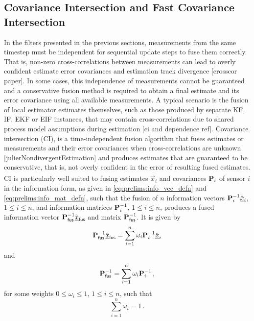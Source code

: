 \subsection{Covariance Intersection and Fast Covariance Intersection}\label{subsec:prelims:fci}
In the filters presented in the previous sections, measurements from the same timestep must be independent for sequential update steps to fuse them correctly. That is, non-zero cross-correlations between measurements can lead to overly confident estimate error covariances and estimation track divergence [crosscor paper]. In some cases, this independence of measurements cannot be guaranteed and a conservative fusion method is required to obtain a final estimate and its error covariance using all available measurements. A typical scenario is the fusion of local estimator estimates themselves, such as those produced by separate KF, IF, EKF or EIF instances, that may contain cross-correlations due to shared process model assumptions during estimation [ci and dependence ref]. Covariance intersection (CI), is a time-independent fusion algorithm that fuses estimates or measurements and their error covariances when cross-correlations are unknown [julierNondivergentEstimation] and produces estimates that are guaranteed to be conservative, that is, not overly confident in the error of resulting fused estimates. CI is particularly well suited to fusing estimates $\hat{\vec{x}}_i$ and covariances ${{\mathbf{P}}}_i$ of sensor $i$ in the information form, as given in \eqref{eq:prelims:info_vec_defn} and \eqref{eq:prelims:info_mat_defn}, such that the fusion of $n$ information vectors ${{\mathbf{P}}}_i^{-1}\hat{{\underline{x}}}_i$, $1\leq i\leq n$, and information matrices ${{\mathbf{P}}}_i^{-1}$, $1\leq i\leq n$, produces a fused information vector ${{\mathbf{P}}}_{\mathsf{fus}}^{-1}\hat{{\underline{x}}}_{\mathsf{fus}}$ and matrix ${{\mathbf{P}}}_{\mathsf{fus}}^{-1}$. It is given by
\begin{equation}\label{eq:prelims:ci_est}
    {\ensuremath{{\mathbf{P}}}}_{\mathsf{fus}}^{-1}\hat{{\underline{x}}}_{\mathsf{fus}} = \sum_{i=1}^n \omega_i {{\mathbf{P}}}_i^{-1} \hat{{\underline{x}}}_i
\end{equation}
and
\begin{equation}\label{eq:prelims:ci_cov}
{\ensuremath{{\mathbf{P}}}}_{\mathsf{fus}}^{-1}=\sum_{i=1}^{n}\omega_i {{\mathbf{P}}}_i^{-1}\,,
\end{equation}
for some weights $0\leq \omega_i \leq 1$, $1\leq i \leq n$, such that
\begin{equation}\label{eq:prelims:ci_weight_sum}
    \sum_{i=1}^n \omega_i = 1\,.
\end{equation}
